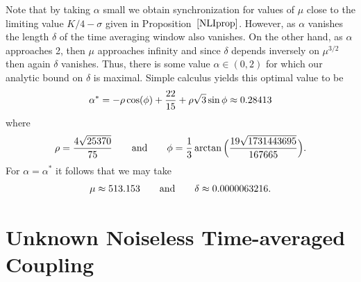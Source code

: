 \documentclass[master,tocprelim,12pt]{unrthesis}
\theoremstyle{definition}
\def\wwords#1{\qquad\hbox{#1}\qquad}
\numberwithin{equation}{chapter}
\begin{document}
\begin{manuscript}
Note that by taking $\alpha$ small we obtain synchronization
for values of $\mu$ close to the limiting value $K/4-\sigma$
given in Proposition~$\ref{NLIprop}$.
However, as $\alpha$ vanishes the length $\delta$ of the
time averaging window also vanishes.
On the other hand, as $\alpha$ approaches 2, then
$\mu$ approaches infinity and
since $\delta$ depends inversely on $\mu^{3/2}$
then again $\delta$ vanishes.
Thus, there is some value $\alpha\in(0,2)$ for which
our analytic bound on $\delta$ is maximal.  Simple
calculus yields this optimal value to be
$$
  \alpha^*=-\rho\cos(\phi)+{22\over 15}+\rho\sqrt3\sin\phi
      \approx 0.28413
$$
where
$$
  \rho={4\sqrt{25370}\over 75}
\wwords{and}
  \phi={1\over 3}\arctan\Big({19\sqrt{1731443695}\over167665}\Big).
$$
For $\alpha=\alpha^*$ it follows that we may take
$$
  \mu\approx 513.153\wwords{and}\delta\approx 0.0000063216.
$$

\section{Unknown Noiseless Time-averaged Coupling}\label{UNTCoupling}


\end{manuscript}
\end{document}
